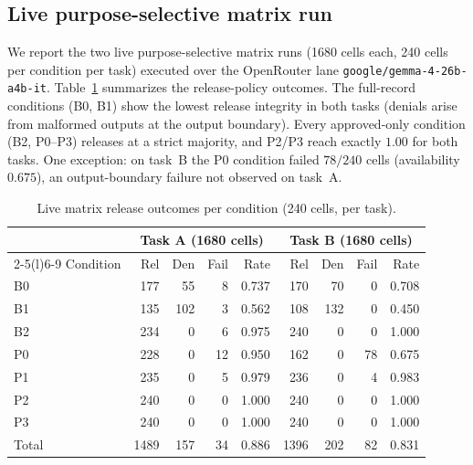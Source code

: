 
\subsection{Live purpose-selective matrix run}

We report the two live purpose-selective matrix runs (1680 cells each, 240 cells
per condition per task) executed over the OpenRouter lane
\texttt{google/gemma-4-26b-a4b-it}. Table~\ref{tab:matrix_release} summarizes the
release-policy outcomes. The full-record conditions (B0, B1) show the lowest
release integrity in both tasks (denials arise from malformed outputs at the
output boundary). Every approved-only condition (B2, P0--P3) releases at a strict
majority, and P2/P3 reach exactly \(1.00\) for both tasks. One exception: on
task~B the P0 condition failed \(78/240\) cells (availability \(0.675\)), an
output-boundary failure not observed on task~A.

\begin{table}[t]
\centering
\caption{Live matrix release outcomes per condition (240 cells, per task).}
\label{tab:matrix_release}
\small
\begin{tabular}{lrrrr|rrrr}
\toprule
 & \multicolumn{4}{c}{Task A (1680 cells)} & \multicolumn{4}{c}{Task B (1680 cells)} \\
\cmidrule(r){2-5}\cmidrule(l){6-9}
Condition & Rel & Den & Fail & Rate & Rel & Den & Fail & Rate \\
\midrule
B0 & 177 & 55 & 8 & 0.737 & 170 & 70 & 0 & 0.708 \\
B1 & 135 & 102 & 3 & 0.562 & 108 & 132 & 0 & 0.450 \\
B2 & 234 & 0 & 6 & 0.975 & 240 & 0 & 0 & 1.000 \\
P0 & 228 & 0 & 12 & 0.950 & 162 & 0 & 78 & 0.675 \\
P1 & 235 & 0 & 5 & 0.979 & 236 & 0 & 4 & 0.983 \\
P2 & 240 & 0 & 0 & 1.000 & 240 & 0 & 0 & 1.000 \\
P3 & 240 & 0 & 0 & 1.000 & 240 & 0 & 0 & 1.000 \\
\midrule
Total & 1489 & 157 & 34 & 0.886 & 1396 & 202 & 82 & 0.831 \\
\bottomrule
\end{tabular}
\end{table}

